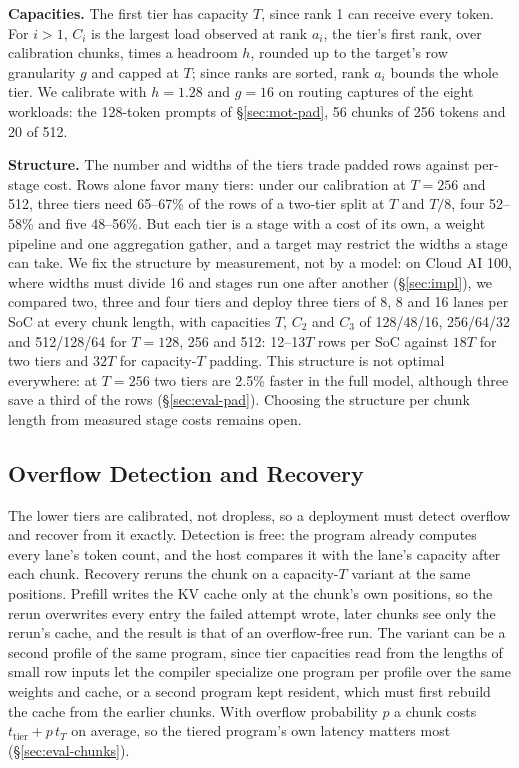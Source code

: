 \textbf{Capacities.} The first tier has capacity $T$, since rank 1 can receive every token. For $i>1$, $C_i$ is the largest
load observed at rank $a_i$, the tier's first rank, over calibration chunks, times a headroom $h$, rounded up to the
target's row granularity $g$ and capped at $T$; since ranks are sorted, rank $a_i$ bounds the whole tier. We calibrate
with $h=1.28$ and $g=16$ on routing captures of the eight workloads: the 128-token prompts of \S\ref{sec:mot-pad}, 56
chunks of 256 tokens and 20 of 512.

\textbf{Structure.} The number and widths of the tiers trade padded rows against per-stage cost. Rows alone favor many
tiers: under our calibration at $T=256$ and 512, three tiers need 65--67\% of the rows of a two-tier split at $T$ and $T/8$, four 52--58\% and
five 48--56\%. But each tier is a stage with a cost of its own, a weight pipeline and one aggregation gather, and a target
may restrict the widths a stage can take. We fix the structure by measurement, not by a model: on Cloud AI 100, where
widths must divide 16 and stages run one after another (\S\ref{sec:impl}), we compared two, three and four tiers and
deploy three tiers of 8, 8 and 16 lanes per SoC at every chunk length, with capacities $T$, $C_2$ and $C_3$ of 128/48/16,
256/64/32 and 512/128/64 for $T=128$, 256 and 512: 12--13$T$ rows per SoC against $18T$ for two
tiers and $32T$ for capacity-$T$ padding. This structure is not optimal everywhere: at $T=256$ two tiers are 2.5\% faster
in the full model, although three save a third of the rows (\S\ref{sec:eval-pad}). Choosing the structure per chunk
length from measured stage costs remains open.

\subsection{Overflow Detection and Recovery}
\label{sec:overflow}

The lower tiers are calibrated, not dropless, so a deployment must detect overflow and recover from it exactly. Detection
is free: the program already computes every lane's token count, and the host compares it with the lane's capacity after
each chunk. Recovery reruns the chunk on a capacity-$T$ variant at the same positions. Prefill writes the KV cache only at
the chunk's own positions, so the rerun overwrites every entry the failed attempt wrote, later chunks see only the rerun's
cache, and the result is that of an overflow-free run. The variant can be a second profile of the same program, since
tier capacities read from the lengths of small row inputs let the compiler specialize one program per profile over the
same weights and cache, or a second program kept resident, which must first rebuild the cache from the earlier chunks.
With overflow probability $p$ a chunk costs $t_{\mathrm{tier}}+p\,t_T$ on
average, so the tiered program's own latency matters most (\S\ref{sec:eval-chunks}).

